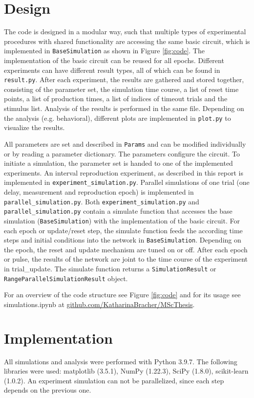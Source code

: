 \documentclass[10pt]{article}
\begin{document}
\pagebreak

\section{Design}
The code is designed in a modular way, such that multiple types of experimental procedures with shared functionality are accessing the same basic circuit, which is implemented in \texttt{BaseSimulation} as shown in Figure \ref{fig:code}.
The implementation of the basic circuit can be reused for all epochs.
Different experiments can have different result types, all of which can be found in \texttt{result.py}. After each experiment, the results are gathered and stored together, consisting of the parameter set, the simulation time course, a list of reset time points, a list of production times, a list of indices of timeout trials and the stimulus list.
Analysis of the results is performed in the same file. Depending on the analysis (e.g. behavioral), different plots are implemented in \texttt{plot.py} to visualize the results. 

All parameters are set and described in \texttt{Params} and can be modified individually or by reading a parameter dictionary. The parameters configure the circuit. 
To initiate a simulation, the parameter set is handed to one of the implemented experiments. 
An interval reproduction experiment, as described in this report is implemented in \texttt{experiment\_simulation.py}. 
Parallel simulations of one trial (one delay, measurement and reproduction epoch) is implemented in \texttt{parallel\_simulation.py}.
Both \texttt{experiment\_simulation.py} and \texttt{parallel\_simulation.py} contain a simulate function that accesses the base simulation (\texttt{BaseSimulation}) with the implementation of the basic circuit.
For each epoch or update/reset step, the simulate function feeds the according time steps and initial conditions into the network in \texttt{BaseSimulation}. Depending on the epoch, the reset and update mechanism are tuned on or off. 
After each epoch or pulse, the results of the network are joint to the time course of the experiment in trial\_update. The simulate function returns a \texttt{SimulationResult} or \texttt{RangeParallelSimulationResult} object.

For an overview of the code structure see Figure \ref{fig:code} and for its usage see simulations.ipynb at \href{https://github.com/KatharinaBracher/MScThesis}{github.com/KatharinaBracher/MScThesis}. 

\section{Implementation}
All simulations and analysis were performed with Python 3.9.7. 
The following libraries were used: matplotlib (3.5.1), NumPy (1.22.3), SciPy (1.8.0), scikit-learn (1.0.2). 
An experiment simulation can not be parallelized, since each step depends on the previous one.
\end{document}
